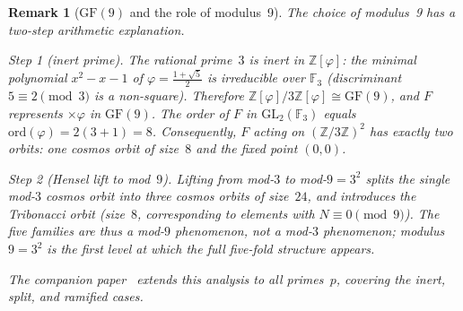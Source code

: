 \documentclass[12pt]{article}
\newtheorem{remark}{Remark}
\begin{document}
\begin{remark}[$\mathrm{GF}(9)$ and the role of modulus~9]\label{rem:gf9}
The choice of modulus~9 has a two-step arithmetic explanation.

\emph{Step 1 (inert prime).}  The rational prime~$3$ is \emph{inert} in $\mathbb{Z}[\varphi]$: the
minimal polynomial $x^2-x-1$ of $\varphi=\frac{1+\sqrt{5}}{2}$ is irreducible over
$\mathbb{F}_3$ (discriminant $5\equiv2\pmod3$ is a non-square).  Therefore
$\mathbb{Z}[\varphi]/3\mathbb{Z}[\varphi]\cong\mathrm{GF}(9)$,
and $F$ represents $\times\varphi$ in $\mathrm{GF}(9)$.  The order of $F$ in
$\mathrm{GL}_2(\mathbb{F}_3)$ equals $\mathrm{ord}(\varphi)=2(3+1)=8$.
Consequently, $F$ acting on $(\mathbb{Z}/3\mathbb{Z})^2$ has exactly two orbits:
one cosmos orbit of size~$8$ and the fixed point $(0,0)$.

\emph{Step 2 (Hensel lift to mod~$9$).}  Lifting from mod-$3$ to mod-$9=3^2$
splits the single mod-$3$ cosmos orbit into three cosmos orbits of size~$24$,
and introduces the Tribonacci orbit (size~$8$, corresponding to elements with
$N\equiv0\pmod9$).  The five families are thus a mod-$9$ phenomenon, not
a mod-$3$ phenomenon; modulus~$9=3^2$ is the first level at which the full
five-fold structure appears.

The companion paper~\cite{modular-dynamics} extends this analysis to all
primes~$p$, covering the inert, split, and ramified cases.
\end{remark}
\end{document}
